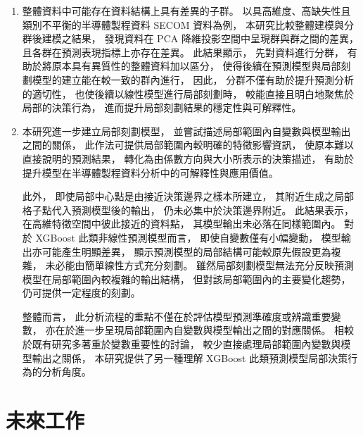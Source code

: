 \documentclass[12pt,a4paper,oneside]{book}
\begin{document}
	\begin{enumerate}
		\item 
		整體資料中可能存在資料結構上具有差異的子群。
		以具高維度、高缺失性且類別不平衡的半導體製程資料 SECOM 資料為例，
		本研究比較整體建模與分群後建模之結果，
		發現資料在 PCA 降維投影空間中呈現群與群之間的差異，
		且各群在預測表現指標上亦存在差異。
		此結果顯示，
		先對資料進行分群，
		有助於將原本具有異質性的整體資料加以區分，
		使得後續在預測模型與局部刻劃模型的建立能在較一致的群內進行，
		因此，
		分群不僅有助於提升預測分析的適切性，
		也使後續以線性模型進行局部刻劃時，
		較能直接且明白地聚焦於局部的決策行為，
		進而提升局部刻劃結果的穩定性與可解釋性。

		\item 
		本研究進一步建立局部刻劃模型，
		並嘗試描述局部範圍內自變數與模型輸出之間的關係，
		此作法可提供局部範圍內較明確的特徵影響資訊，
		使原本難以直接說明的預測結果，
		轉化為由係數方向與大小所表示的決策描述，
		有助於提升模型在半導體製程資料分析中的可解釋性與應用價值。
		
		此外，
		即使局部中心點是由接近決策邊界之樣本所建立，
		其附近生成之局部格子點代入預測模型後的輸出，
		仍未必集中於決策邊界附近。
		此結果表示，
		在高維特徵空間中彼此接近的資料點，
		其模型輸出未必落在同樣範圍內。
		對於 XGBoost 此類非線性預測模型而言，
		即使自變數僅有小幅變動，
		模型輸出亦可能產生明顯差異，
		顯示預測模型的局部結構可能較原先假設更為複雜，
		未必能由簡單線性方式充分刻劃。
		雖然局部刻劃模型無法充分反映預測模型在局部範圍內較複雜的輸出結構，
		但對該局部範圍內的主要變化趨勢，
		仍可提供一定程度的刻劃。

		整體而言，
		此分析流程的重點不僅在於評估模型預測準確度或辨識重要變數，
		亦在於進一步呈現局部範圍內自變數與模型輸出之間的對應關係。
		相較於既有研究多著重於變數重要性的討論，
		較少直接處理局部範圍內變數與模型輸出之關係，
		本研究提供了另一種理解 XGBoost 此類預測模型局部決策行為的分析角度。

	\end{enumerate}

	\section{未來工作}
	
	
	
	
\end{document}
